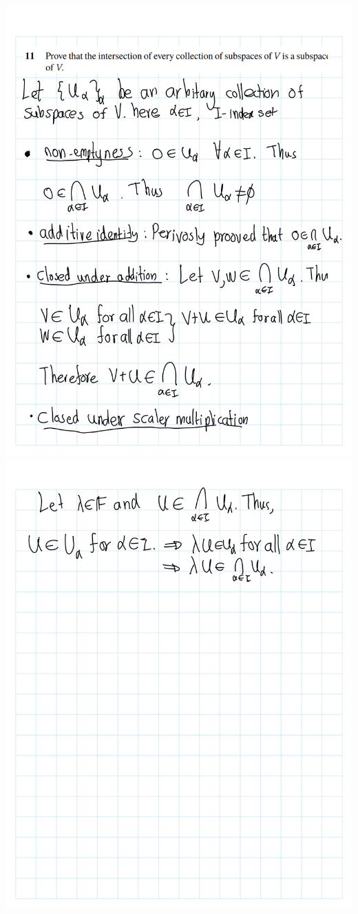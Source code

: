 \documentclass[
]{book}
\theoremstyle{definition}
\theoremstyle{definition}
\theoremstyle{definition}
\theoremstyle{definition}
\theoremstyle{remark}
\begin{document}
\begin{enumerate}
  \includegraphics{fig/Ex1C/Ex/Ex-10.png} \includegraphics{fig/Ex1C/Ex/Ex-11.png}

\end{enumerate}
\end{document}
